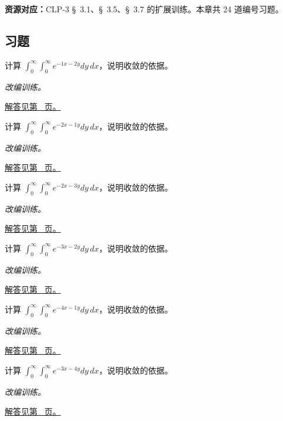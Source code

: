 \documentclass[12pt,fontset=fandol]{ctexart}
\begin{document}
\textbf{资源对应：}CLP-3 \S~3.1、\S~3.5、\S~3.7 的扩展训练。本章共 24 道编号习题。
\subsection{习题}
\begin{example}[第一象限的指数积分]\label{ex:c40q1}
计算 $\displaystyle\int_0^\infty\int_0^\infty e^{-1x-2y}dy\,dx$，说明收敛的依据。
\par\textit{改编训练。}\par\hyperref[ans:c40q1]{解答见第~\pageref{ans:c40q1} 页。}
\end{example}
\begin{example}[第一象限的指数积分]\label{ex:c40q2}
计算 $\displaystyle\int_0^\infty\int_0^\infty e^{-2x-1y}dy\,dx$，说明收敛的依据。
\par\textit{改编训练。}\par\hyperref[ans:c40q2]{解答见第~\pageref{ans:c40q2} 页。}
\end{example}
\begin{example}[第一象限的指数积分]\label{ex:c40q3}
计算 $\displaystyle\int_0^\infty\int_0^\infty e^{-2x-3y}dy\,dx$，说明收敛的依据。
\par\textit{改编训练。}\par\hyperref[ans:c40q3]{解答见第~\pageref{ans:c40q3} 页。}
\end{example}
\begin{example}[第一象限的指数积分]\label{ex:c40q4}
计算 $\displaystyle\int_0^\infty\int_0^\infty e^{-3x-2y}dy\,dx$，说明收敛的依据。
\par\textit{改编训练。}\par\hyperref[ans:c40q4]{解答见第~\pageref{ans:c40q4} 页。}
\end{example}
\begin{example}[第一象限的指数积分]\label{ex:c40q5}
计算 $\displaystyle\int_0^\infty\int_0^\infty e^{-4x-1y}dy\,dx$，说明收敛的依据。
\par\textit{改编训练。}\par\hyperref[ans:c40q5]{解答见第~\pageref{ans:c40q5} 页。}
\end{example}
\begin{example}[第一象限的指数积分]\label{ex:c40q6}
计算 $\displaystyle\int_0^\infty\int_0^\infty e^{-3x-4y}dy\,dx$，说明收敛的依据。
\par\textit{改编训练。}\par\hyperref[ans:c40q6]{解答见第~\pageref{ans:c40q6} 页。}
\end{example}
\end{document}
